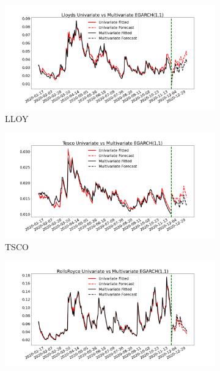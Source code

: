 \begin{figure}[H]
\begin{subfigure}{.49\linewidth}
  \includegraphics[width=\linewidth]{images/multiGarch/plot 1.png}
  \caption{LLOY}
  \label{fig:A}
\end{subfigure} %
\begin{subfigure}{.49\linewidth}
  \includegraphics[width=\linewidth]{images/multiGarch/plot 2.png}
  \caption{TSCO}
  \label{fig:B}
\end{subfigure}
\medskip %
\begin{subfigure}{.49\linewidth}
  \includegraphics[width=\linewidth]{images/multiGarch/plot 3.png}

\end{subfigure}
\end{figure}
